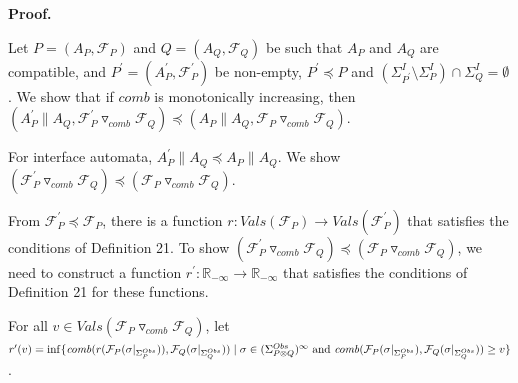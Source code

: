 \documentclass[10pt,a4paper]{article}
\begin{document}
 
 
 
 
\par\medskip\noindent\textbf{Proof.}\par
 
 
Let $P=(A_{P},\mathcal{F}_{P})$ and $Q=(A_{Q},\mathcal{F}_{Q})$ be such that $A_{P}$ and $A_{Q}$ are compatible, and $P^{\prime}=(A_{P}^{\prime},\mathcal{F}_{P}^{\prime})$ be non-empty, $P^{\prime}\preceq P$ and $(\Sigma_{P^{\prime}}^{I}\setminus\Sigma_{P}^{I})\cap\Sigma_{Q}^{I}=\emptyset$. We show that if $\mathit{comb}$ is monotonically increasing, then $(A_{P}^{\prime}\parallel A_{Q},{{\mathcal{F}_{P}^{\prime}}\mathbin{\triangledown_{\mathit{comb}}}{\mathcal{F}_{Q}}})\preceq(A_{P}\parallel A_{Q},{{\mathcal{F}_{P}}\mathbin{\triangledown_{\mathit{comb}}}{\mathcal{F}_{Q}}})$.\par
 
 
 
For interface automata, $A_{P}^{\prime}\parallel A_{Q}\preceq A_{P}\parallel A_{Q}$. We show $({{\mathcal{F}_{P}^{\prime}}\mathbin{\triangledown_{\mathit{comb}}}{\mathcal{F}_{Q}}})\!\preceq\!({{\mathcal{F}_{P}}\mathbin{\triangledown_{\mathit{comb}}}{\mathcal{F}_{Q}}})$.\par
 
 
 
From $\mathcal{F}_{P}^{\prime}\preceq\mathcal{F}_{P}$, there is a function $r:Vals(\mathcal{F}_{P})\to Vals(\mathcal{F}_{P}^{\prime})$ that satisfies the conditions of Definition 21. To show $({{\mathcal{F}_{P}^{\prime}}\mathbin{\triangledown_{\mathit{comb}}}{\mathcal{F}_{Q}}})\preceq({{\mathcal{F}_{P}}\mathbin{\triangledown_{\mathit{comb}}}{\mathcal{F}_{Q}}})$, we need to construct a function $r^{\prime}:\mathbb{R}_{-\infty}\to\mathbb{R}_{-\infty}$ that satisfies the conditions of Definition 21 for these functions.\par
 
 
 
For all $v\in Vals({{\mathcal{F}_{P}}\mathbin{\triangledown_{\mathit{comb}}}{\mathcal{F}_{Q}}})$, let $r^{\prime}(v)=\inf\{\mathit{comb}(r(\mathcal{F}_{P}(\sigma|_{\Sigma_{P}^{Obs}})),\mathcal{F}_{Q}(\sigma|_{\Sigma_{Q}^{Obs}}))\mid\\
\sigma\in(\Sigma_{P\otimes Q}^{Obs})^{\infty}\text{ and }\mathit{comb}(\mathcal{F}_{P}(\sigma|_{\Sigma_{P}^{Obs}}),\mathcal{F}_{Q}(\sigma|_{\Sigma_{Q}^{Obs}}))\geq v\}$.\par
 
\end{document}
